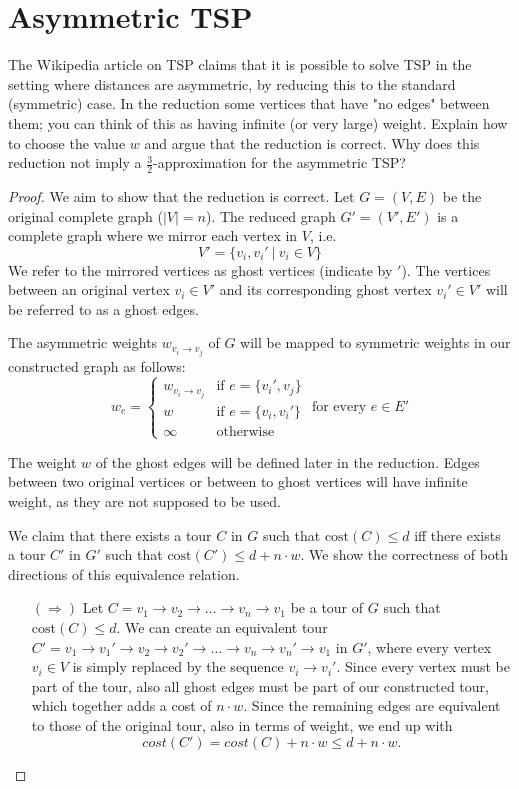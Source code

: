 \documentclass{article}
\begin{document}
\section{Asymmetric TSP}

The Wikipedia article on TSP claims that it is possible to solve TSP in the setting where distances are asymmetric, by reducing this to the standard (symmetric) case. In the reduction some vertices that have "no edges" between them; you can think of this as having infinite (or very large) weight. Explain how to choose the value $w$ and argue that the reduction is correct.  Why does this reduction not imply a $\frac{3}{2}$-approximation for the asymmetric TSP?

\begin{proof}
    We aim to show that the reduction is correct. Let $G=(V,E)$ be the original complete graph ($|V| = n$). The reduced graph $G'=(V',E')$ is a complete graph where we mirror each vertex in $V$, i.e.
    \[
        V' = \{v_i, v_i'\ |\ v_i \in V\}
    \]
    We refer to the mirrored vertices as ghost vertices (indicate by $'$). The vertices between an original vertex $v_i \in V'$ and its corresponding ghost vertex $v_i' \in V'$ will be referred to as a ghost edges. 

    The asymmetric weights $w_{v_i \to v_j}$ of $G$ will be mapped to symmetric weights in our constructed graph as follows:
    \[
        w_e = \begin{cases}
            w_{v_i \to v_j} & \text{if }e = \{v_i', v_j\}\\
            w & \text{if }e = \{v_i, v_i'\}\\
            \infty & \text{otherwise}
        \end{cases} \text{ for every } e \in E'
    \]

    The weight $w$ of the ghost edges will be defined later in the reduction. Edges between two original vertices or between to ghost vertices will have infinite weight, as they are not supposed to be used.
    
    
    We claim that there exists a tour $C$ in $G$ such that $\text{cost}(C) \le d$ iff there exists a tour $C'$ in $G'$ such that $\text{cost}(C') \le d + n \cdot w$. We show the correctness of both directions of this equivalence relation.

    \begin{itemize}
        \item[$(\Rightarrow)$]  Let $C = v_1 \rightarrow v_2 \rightarrow \dots \rightarrow v_n \rightarrow v_1$ be a tour of $G$ such that $\text{cost}(C) \le d$. We can create an equivalent tour $C' = v_1 \rightarrow v_1' \rightarrow v_2\rightarrow v_2' \rightarrow \dots \rightarrow v_n \rightarrow v_n' \rightarrow v_1$ in $G'$, where every vertex $v_i \in V$ is simply replaced by the sequence $v_i \rightarrow v_i'$. Since every vertex must be part of the tour, also all ghost edges must be part of our constructed tour, which together adds a cost of $n \cdot w$. Since the remaining edges are equivalent to those of the original tour, also in terms of weight, we end up with \[cost(C') = cost(C) + n \cdot w \le d + n \cdot w.\]


\end{itemize}
\end{proof}
\end{document}
